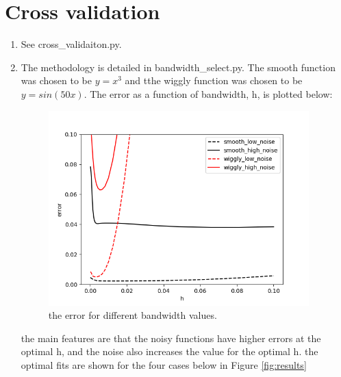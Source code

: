 \documentclass[10pt]{article}
\begin{document}
    \section*{Cross validation}
    \begin{enumerate}[label=(\Alph*)]
    \item
    See cross\_validaiton.py.
    \item
    The methodology is detailed in bandwidth\_select.py. The smooth function was chosen to be $y=x^3$ and tthe wiggly function was chosen to be $y=sin(50x)$. The error as a function of bandwidth, h, is plotted below:

    \begin{figure}[htb] \centering
    \includegraphics[width=0.95\textwidth]{./h_select.png}
    \caption{the error for different bandwidth values.}
    \label{fig:h_select}
    \end{figure}

    the main features are that the noisy functions have higher errors at the optimal h, and the noise also increases the value for the optimal h. the optimal fits are shown for the four cases below in Figure \ref{fig:results}


\end{enumerate}
\end{document}
